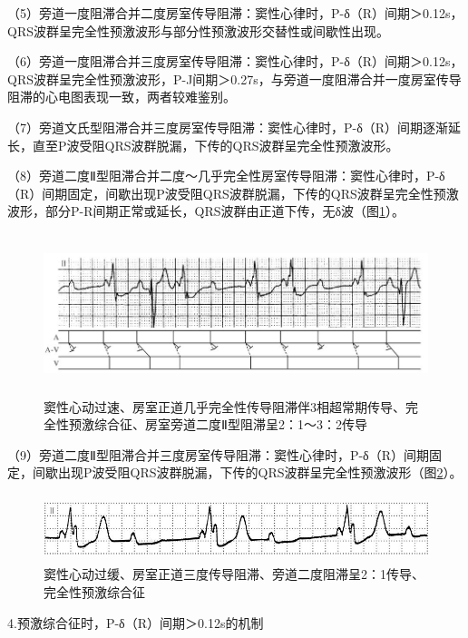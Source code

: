 （5）旁道一度阻滞合并二度房室传导阻滞：窦性心律时，P-δ（R）间期＞0.12s，QRS波群呈完全性预激波形与部分性预激波形交替性或间歇性出现。

（6）旁道一度阻滞合并三度房室传导阻滞：窦性心律时，P-δ（R）间期＞0.12s，QRS波群呈完全性预激波形，P-J间期＞0.27s，与旁道一度阻滞合并一度房室传导阻滞的心电图表现一致，两者较难鉴别。

（7）旁道文氏型阻滞合并三度房室传导阻滞：窦性心律时，P-δ（R）间期逐渐延长，直至P波受阻QRS波群脱漏，下传的QRS波群呈完全性预激波形。

（8）旁道二度Ⅱ型阻滞合并二度～几乎完全性房室传导阻滞：窦性心律时，P-δ（R）间期固定，间歇出现P波受阻QRS波群脱漏，下传的QRS波群呈完全性预激波形，部分P-R间期正常或延长，QRS波群由正道下传，无δ波（图\ref{fig36-21}）。

\begin{figure}[!htbp]
 \centering
 \includegraphics[width=5.92708in,height=1.84375in]{./images/Image00593.jpg}
 \captionsetup{justification=centering}
 \caption{窦性心动过速、房室正道几乎完全性传导阻滞伴3相超常期传导、完全性预激综合征、房室旁道二度Ⅱ型阻滞呈2：1～3：2传导}
 \label{fig36-21}
  \end{figure} 

（9）旁道二度Ⅱ型阻滞合并三度房室传导阻滞：窦性心律时，P-δ（R）间期固定，间歇出现P波受阻QRS波群脱漏，下传的QRS波群呈完全性预激波形（图\ref{fig36-22}）。

\begin{figure}[!htbp]
 \centering
 \includegraphics[width=5.625in,height=0.77083in]{./images/Image00594.jpg}
 \captionsetup{justification=centering}
 \caption{窦性心动过缓、房室正道三度传导阻滞、旁道二度阻滞呈2：1传导、完全性预激综合征}
 \label{fig36-22}
  \end{figure} 

4.预激综合征时，P-δ（R）间期＞0.12s的机制

